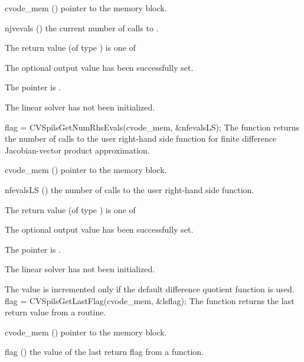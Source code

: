 {
  \begin{args}
  \item[cvode\_mem] ()
    pointer to the {\cvode} memory block.
  \item[njvevals] ()
    the current number of calls to .
  \end{args}
}
{
  The return value  (of type ) is one of
  \begin{args}
  \item[\Id{CVSPILS\_SUCCESS}] 
    The optional output value has been successfully set.
  \item[\Id{CVSPILS\_MEM\_NULL}]
    The  pointer is .
  \item[\Id{CVSPILS\_LMEM\_NULL}]
    The {\cvspils} linear solver has not been initialized.
  \end{args}
}
{}
{
  flag = CVSpilsGetNumRhsEvals(cvode\_mem, \&nfevalsLS);
}
{
  The function  returns the
  number of calls to the user right-hand side function for
  finite difference Jacobian-vector product approximation.
}
{
  \begin{args}
  \item[cvode\_mem] ()
    pointer to the {\cvode} memory block.
  \item[nfevalsLS] ()
    the number of calls to the user right-hand side function.
  \end{args}
}
{
  The return value  (of type ) is one of
  \begin{args}
  \item[\Id{CVSPILS\_SUCCESS}] 
    The optional output value has been successfully set.
  \item[\Id{CVSPILS\_MEM\_NULL}]
    The  pointer is .
  \item[\Id{CVSPILS\_LMEM\_NULL}]
    The {\cvspils} linear solver has not been initialized.
  \end{args}
}
{
  The value  is incremented only if the default 
   difference quotient function is used.
}
{
  flag = CVSpilsGetLastFlag(cvode\_mem, \&lsflag);
}
{
  The function  returns the
  last return value from a {\cvspils} routine. 
}
{
  \begin{args}
  \item[cvode\_mem] ()
    pointer to the {\cvode} memory block.
  \item[flag] ()
    the value of the last return flag from a {\cvspils} function.
  \end{args}
}
